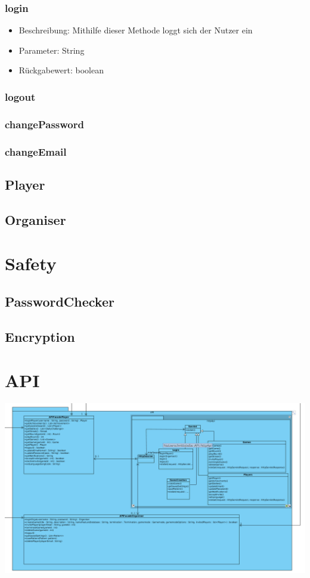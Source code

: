 \documentclass[a4paper]{scrreprt}
\begin{document}
	\subsubsection{login}
	\begin{itemize}
		\item Beschreibung: Mithilfe dieser Methode loggt sich der Nutzer ein
		\item Parameter: String
		\item Rückgabewert: boolean
	\end{itemize}
	\subsubsection{logout}
	\subsubsection{changePassword}
	\subsubsection{changeEmail}

	\subsection{Player}
	\subsection{Organiser}

	\section{Safety}
	\subsection{PasswordChecker}
	\subsection{Encryption}

	\section{API}
	\includegraphics[width=\textwidth]{img/api.png}
\end{document}
